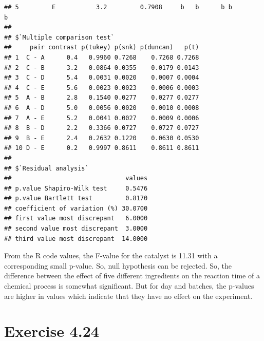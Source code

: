 \documentclass[a4paper]{article}\usepackage{graphicx, color}
\makeatletter
\newenvironment{kframe}{%
 \def\at@end@of@kframe{}%
 \ifinner\ifhmode%
  \def\at@end@of@kframe{\end{minipage}}%
  \begin{minipage}{\columnwidth}%
 \fi\fi%
 \def\FrameCommand##1{\hskip\@totalleftmargin \hskip-\fboxsep
 \colorbox{shadecolor}{##1}\hskip-\fboxsep
     \hskip-\linewidth \hskip-\@totalleftmargin \hskip\columnwidth}%
 \MakeFramed {\advance\hsize-\width
   \@totalleftmargin\z@ \linewidth\hsize
   \@setminipage}}%
 {\par\unskip\endMakeFramed%
 \at@end@of@kframe}
\newenvironment{knitrout}{}{} %
\makeatother
\begin{document}
\begin{knitrout}
\begin{kframe}
\begin{verbatim}
## 5         E           3.2         0.7908     b   b      b b           b
## 
## $`Multiple comparison test`
##     pair contrast p(tukey) p(snk) p(duncan)   p(t)
## 1  C - A      0.4   0.9960 0.7268    0.7268 0.7268
## 2  C - B      3.2   0.0864 0.0355    0.0179 0.0143
## 3  C - D      5.4   0.0031 0.0020    0.0007 0.0004
## 4  C - E      5.6   0.0023 0.0023    0.0006 0.0003
## 5  A - B      2.8   0.1540 0.0277    0.0277 0.0277
## 6  A - D      5.0   0.0056 0.0020    0.0010 0.0008
## 7  A - E      5.2   0.0041 0.0027    0.0009 0.0006
## 8  B - D      2.2   0.3366 0.0727    0.0727 0.0727
## 9  B - E      2.4   0.2632 0.1220    0.0630 0.0530
## 10 D - E      0.2   0.9997 0.8611    0.8611 0.8611
## 
## $`Residual analysis`
##                               values
## p.value Shapiro-Wilk test     0.5476
## p.value Bartlett test         0.8170
## coefficient of variation (%) 30.0700
## first value most discrepant   6.0000
## second value most discrepant  3.0000
## third value most discrepant  14.0000
\end{verbatim}
\end{kframe}
\end{knitrout}


From the R code values, the F-value for the catalyst is 11.31 with a corresponding small p-value. So, null hypothesis can be rejected. So, the difference between the effect of five different ingredients  on the reaction time of a chemical process is somewhat significant. But for day and batches, the p-values are higher in values which indicate that they have no effect on the experiment. \\


\vspace{4 mm}

\section{ Exercise 4.24}
\end{document}
